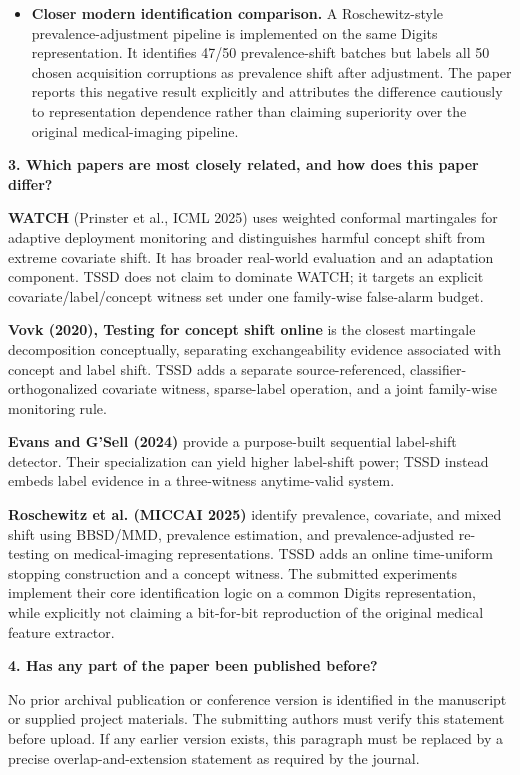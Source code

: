 \documentclass[11pt,a4paper]{article}
\begin{document}
\begin{itemize}
\item \textbf{Closer modern identification comparison.} A Roschewitz-style prevalence-adjustment pipeline is implemented on the same Digits representation. It identifies 47/50 prevalence-shift batches but labels all 50 chosen acquisition corruptions as prevalence shift after adjustment. The paper reports this negative result explicitly and attributes the difference cautiously to representation dependence rather than claiming superiority over the original medical-imaging pipeline.
\end{itemize}

\textbf{3. Which papers are most closely related, and how does this paper differ?}

\textbf{WATCH} (Prinster et al., ICML 2025) uses weighted conformal martingales for adaptive deployment monitoring and distinguishes harmful concept shift from extreme covariate shift. It has broader real-world evaluation and an adaptation component. TSSD does not claim to dominate WATCH; it targets an explicit covariate/label/concept witness set under one family-wise false-alarm budget.

\textbf{Vovk (2020), Testing for concept shift online} is the closest martingale decomposition conceptually, separating exchangeability evidence associated with concept and label shift. TSSD adds a separate source-referenced, classifier-orthogonalized covariate witness, sparse-label operation, and a joint family-wise monitoring rule.

\textbf{Evans and G'Sell (2024)} provide a purpose-built sequential label-shift detector. Their specialization can yield higher label-shift power; TSSD instead embeds label evidence in a three-witness anytime-valid system.

\textbf{Roschewitz et al. (MICCAI 2025)} identify prevalence, covariate, and mixed shift using BBSD/MMD, prevalence estimation, and prevalence-adjusted re-testing on medical-imaging representations. TSSD adds an online time-uniform stopping construction and a concept witness. The submitted experiments implement their core identification logic on a common Digits representation, while explicitly not claiming a bit-for-bit reproduction of the original medical feature extractor.

\textbf{4. Has any part of the paper been published before?}

No prior archival publication or conference version is identified in the manuscript or supplied project materials. The submitting authors must verify this statement before upload. If any earlier version exists, this paragraph must be replaced by a precise overlap-and-extension statement as required by the journal.
\end{document}
